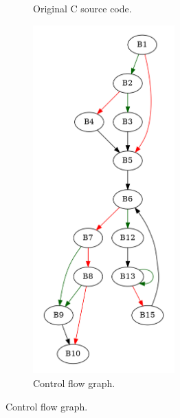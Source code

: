 \begin{figure}[htbp]
	\centering
	\begin{subfigure}[b]{0.30\textwidth}
		\centering
		
		\caption{Original C source code.}
	\end{subfigure}
	\begin{subfigure}[b]{0.50\textwidth}
		\centering
		\includegraphics[width=0.6\textwidth]{inc/appendices/examples/hammock/counter-example/jump-threading-and-short-circuit/jump-threading-and-short-circuit_jump/f.png}
		\caption{Control flow graph.}
	\end{subfigure}
\end{figure}

